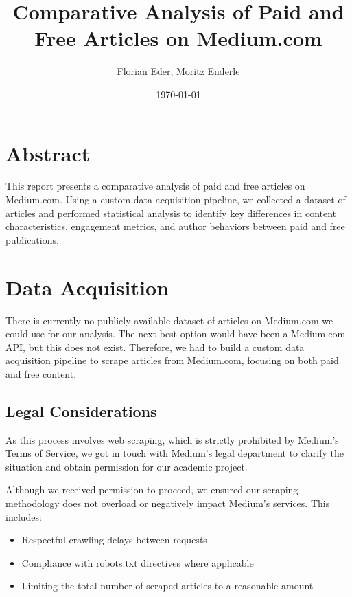 \documentclass[11pt,a4paper]{article}
\title{\Huge\bfseries Comparative Analysis of Paid and Free Articles on Medium.com}
\author{Florian Eder, Moritz Enderle}
\date{\today}
\begin{document}
\maketitle
\thispagestyle{empty}

\newpage
\tableofcontents
\newpage

\section*{Abstract}
This report presents a comparative analysis of paid and free articles on Medium.com. Using a custom data acquisition pipeline, we collected a dataset of articles and performed statistical analysis to identify key differences in content characteristics, engagement metrics, and author behaviors between paid and free publications.

\section{Data Acquisition}

There is currently no publicly available dataset of articles on Medium.com we could use for our analysis. 
The next best option would have been a Medium.com API, but this does not exist.
Therefore, we had to build a custom data acquisition pipeline to scrape articles from Medium.com, focusing on both paid and free content.

\subsection{Legal Considerations}

As this process involves web scraping, which is strictly prohibited by Medium's Terms of Service, we got in touch with Medium's legal department to clarify the situation and obtain permission for our academic project.

Although we received permission to proceed, we ensured our scraping methodology does not overload or negatively impact Medium's services. This includes:
\begin{itemize}
    \item Respectful crawling delays between requests
    \item Compliance with robots.txt directives where applicable
    \item Limiting the total number of scraped articles to a reasonable amount
\end{itemize}
\end{document}
